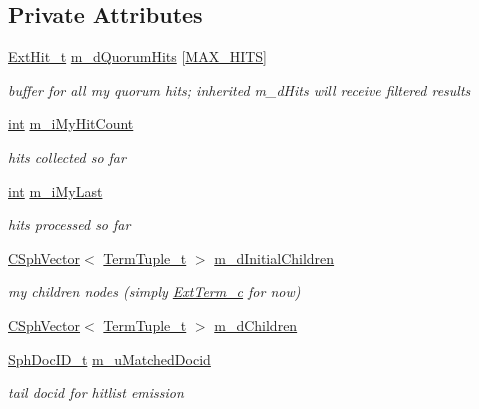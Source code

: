 \subsection*{Private Attributes}
\begin{DoxyCompactItemize}
\item 
\hyperlink{structExtHit__t}{Ext\-Hit\-\_\-t} \hyperlink{classExtQuorum__c_ac516e17dd9536d086bf35aaf5b25a273}{m\-\_\-d\-Quorum\-Hits} \mbox{[}\hyperlink{classExtNode__i_a79b81cba51253fdbe56fd3595fac9ab4}{M\-A\-X\-\_\-\-H\-I\-T\-S}\mbox{]}
\begin{DoxyCompactList}\small\item\em buffer for all my quorum hits; inherited m\-\_\-d\-Hits will receive filtered results \end{DoxyCompactList}\item 
\hyperlink{sphinxexpr_8cpp_a4a26e8f9cb8b736e0c4cbf4d16de985e}{int} \hyperlink{classExtQuorum__c_a0fcb4df0253039b183597e3c7aa9e50e}{m\-\_\-i\-My\-Hit\-Count}
\begin{DoxyCompactList}\small\item\em hits collected so far \end{DoxyCompactList}\item 
\hyperlink{sphinxexpr_8cpp_a4a26e8f9cb8b736e0c4cbf4d16de985e}{int} \hyperlink{classExtQuorum__c_a29760dc18c41ce8fa14e924145d894cb}{m\-\_\-i\-My\-Last}
\begin{DoxyCompactList}\small\item\em hits processed so far \end{DoxyCompactList}\item 
\hyperlink{classCSphVector}{C\-Sph\-Vector}$<$ \hyperlink{structExtQuorum__c_1_1TermTuple__t}{Term\-Tuple\-\_\-t} $>$ \hyperlink{classExtQuorum__c_a4c54e9b1dddd17f5e31cf81eca77474a}{m\-\_\-d\-Initial\-Children}
\begin{DoxyCompactList}\small\item\em my children nodes (simply \hyperlink{classExtTerm__c}{Ext\-Term\-\_\-c} for now) \end{DoxyCompactList}\item 
\hyperlink{classCSphVector}{C\-Sph\-Vector}$<$ \hyperlink{structExtQuorum__c_1_1TermTuple__t}{Term\-Tuple\-\_\-t} $>$ \hyperlink{classExtQuorum__c_a10bf8d557f130030f0eebae0a7bc99c1}{m\-\_\-d\-Children}
\item 
\hyperlink{sphinx_8h_a3176771631c12a9e4897272003e6b447}{Sph\-Doc\-I\-D\-\_\-t} \hyperlink{classExtQuorum__c_a39c92bddc5e5b3851c65a6729457f252}{m\-\_\-u\-Matched\-Docid}
\begin{DoxyCompactList}\small\item\em tail docid for hitlist emission \end{DoxyCompactList}\item 

\end{DoxyCompactItemize}

